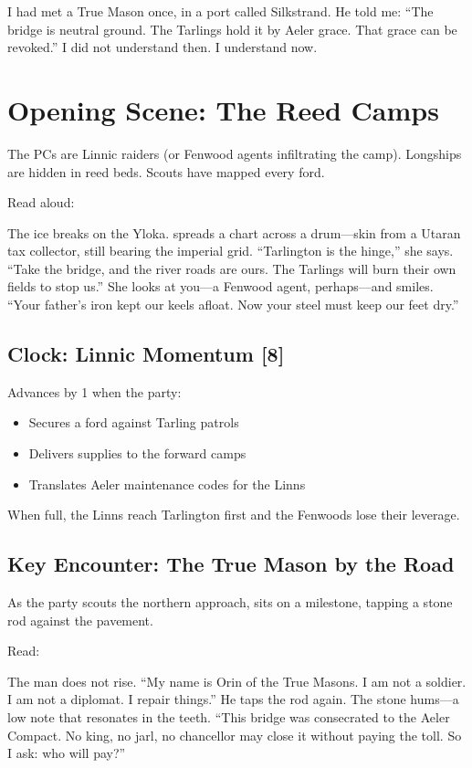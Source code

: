 \documentclass[11pt,a5paper]{book}
\newcommand{\clock}[1]{\textbf{[#1]}}
\begin{document}
I had met a True Mason once, in a port called Silkstrand. He told me: ``The bridge is neutral ground. The Tarlings hold it by Aeler grace. That grace can be revoked.'' I did not understand then. I understand now.

\section*{Opening Scene: The Reed Camps}

The PCs are Linnic raiders (or Fenwood agents infiltrating the camp). Longships are hidden in reed beds. Scouts have mapped every ford.

Read aloud:
\begin{quoting}
The ice breaks on the Yloka. \soren{} spreads a chart across a drum---skin from a Utaran tax collector, still bearing the imperial grid. ``Tarlington is the hinge,'' she says. ``Take the bridge, and the river roads are ours. The Tarlings will burn their own fields to stop us.'' She looks at you---a Fenwood agent, perhaps---and smiles. ``Your father's iron kept our keels afloat. Now your steel must keep our feet dry.''
\end{quoting}

\subsection*{Clock: Linnic Momentum \clock{8}}

Advances by 1 when the party:
\begin{itemize}[leftmargin=*]
\item Secures a ford against Tarling patrols
\item Delivers supplies to the forward camps
\item Translates Aeler maintenance codes for the Linns
\end{itemize}
When full, the Linns reach Tarlington first and the Fenwoods lose their leverage.

\subsection*{Key Encounter: The True Mason by the Road}

As the party scouts the northern approach, \orin{} sits on a milestone, tapping a stone rod against the pavement.

Read:
\begin{quoting}
The man does not rise. ``My name is Orin of the True Masons. I am not a soldier. I am not a diplomat. I repair things.'' He taps the rod again. The stone hums---a low note that resonates in the teeth. ``This bridge was consecrated to the Aeler Compact. No king, no jarl, no chancellor may close it without paying the toll. So I ask: who will pay?''
\end{quoting}
\end{document}

